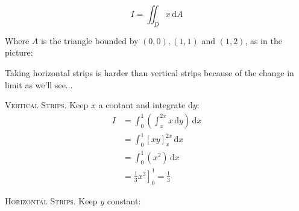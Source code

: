 \documentclass[10pt]{scrartcl}
\begin{document}
\begin{example}
\[
  I = \iint_D x\,\mathrm{d}A
\]

Where $A$ is the triangle bounded by $(0,0), (1,1)$ and $(1,2)$, as in the picture:
\begin{center}
\end{center}

Taking horizontal strips is harder than vertical strips because of the change in limit as we'll see... 

\textsc{Vertical Strips.} Keep $x$ a contant	 and integrate $\mathrm{d}y$: 
\begin{align*}
  I &= \int_0^1 \left(\int_x^{2x} x\,\mathrm{d}y\right)\,\mathrm{d}x\\ 
  &= \int_0^1 \left[xy\right]_x^{2x}\,\mathrm{d}x \\
  &= \int_0^1 (x^2)\,\mathrm{d}x\\
  &= \left.\frac{1}{3}x^3\right]_0^1 =  \frac{1}{3}
\end{align*}


\textsc{Horizontal Strips.} Keep $y$ constant: 


\end{example}
\end{document}
